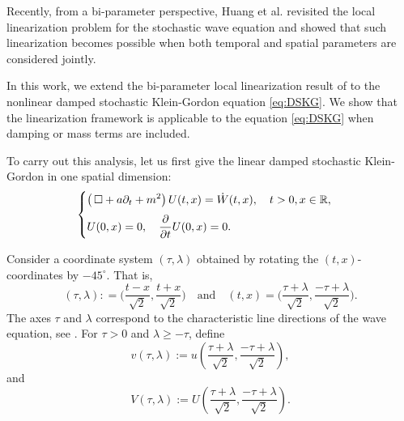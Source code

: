 \documentclass[11pt,reqno]{amsart}
\numberwithin{equation}{section}
\def\R{\mathbb{R}}
\newcommand{\1}{{\bf 1}}
\newcommand{\2}{{\bf 2}}
\newcommand*\DAlambert{\mathop{} \mathbin\Box}%
\begin{document}
   
  Recently,  from a bi-parameter perspective,  Huang  et al.   \cite{HOO2024}  revisited the local linearization problem for the stochastic wave equation and showed that such linearization becomes possible when both temporal and spatial parameters are considered jointly.       
  
  In this work, we extend   the bi-parameter local linearization result of \cite{HOO2024} to the nonlinear damped stochastic Klein-Gordon equation \eqref{eq:DSKG}.    We show that the linearization framework is applicable to the equation \eqref{eq:DSKG}   when damping or mass terms are included.
        
        
       To carry out this analysis,  let us first give the    linear damped stochastic Klein-Gordon in one spatial dimension: 
      \begin{equation}\label{eq:DSKG linear}
\begin{cases}
\vspace{6pt}
\displaystyle{\left(\DAlambert+a\partial_t+m^2\right )U(t,x)=\dot
    W(t,x), \quad t>0, x \in \R,}\\
\displaystyle{U(0, x) = 0, \quad \frac{\partial}{\partial t} U(0, x) = 0.}
\end{cases}
\end{equation}

 Consider a   coordinate system $(\tau, \lambda)$ obtained by rotating the $(t, x)$-coordinates by $-45^\circ$.  That is, 
\begin{equation}\label{eq transform}
(\tau, \lambda): = \Big(\frac{t-x}{\sqrt{2}}, \frac{t+x}{\sqrt{2}}\Big) \quad \text{and} \quad (t, x) 
= \Big( \frac{\tau+\lambda}{\sqrt{2}}, 
\frac{-\tau+\lambda}{\sqrt{2}} \Big). 
\end{equation}
The  axes $\tau$ and $\lambda$ correspond to  the characteristic line directions of the wave equation, see \cite{QT07,Walsh86}.                  
        For $\tau>0$ and $\lambda\ge -\tau$,  define 
\begin{equation}\label{SWE 2}
v(\tau, \lambda) := u\left(\frac{\tau+\lambda}{\sqrt{2}}, \frac{-\tau+\lambda}{\sqrt{2}}\right),
\end{equation} 
and
\begin{equation}\label{SWE 3}
V(\tau, \lambda) := U\left(\frac{\tau+\lambda}{\sqrt{2}}, \frac{-\tau+\lambda}{\sqrt{2}}\right). 
\end{equation}
\end{document}
